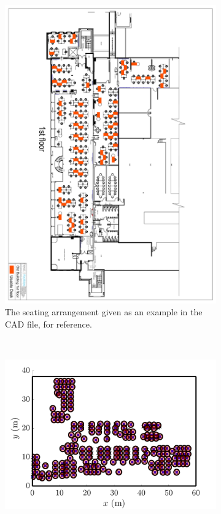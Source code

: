 \documentclass[11pt,a4paper]{article}
\begin{document}
\begin{figure}[ht!]
\centering
\begin{subfigure}[h]{0.95\linewidth}
\centering
\includegraphics[scale = 0.36, angle = 90]{Old_building_1st_floor_usable_desks.pdf}
\caption{The seating arrangement given as an example in the CAD file, for reference.}
\label{Reference}
\end{subfigure}
~
\begin{subfigure}[h]{0.49\linewidth}
\centering
\includegraphics[width = \linewidth]{one_metre.png}

\end{subfigure}
\end{figure}
\end{document}
